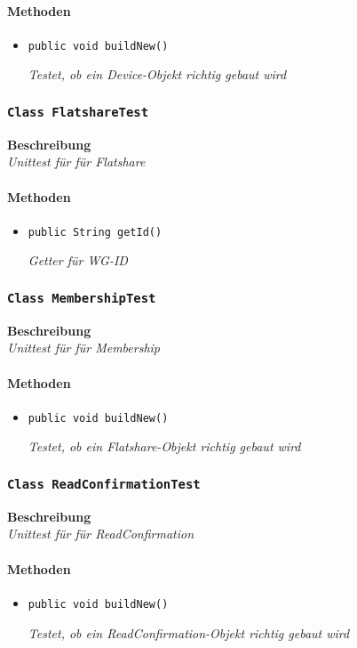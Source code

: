  \paragraph*{Methoden}
 \begin{itemize}
    	\item{\texttt{public void buildNew()}}
    	
    	\textit{Testet, ob ein Device-Objekt richtig gebaut wird}
 \end{itemize}

 \subsubsection{\texttt{Class FlatshareTest}}
 \textbf{Beschreibung} \\
 \textit{Unittest für für Flatshare}
 \paragraph*{Methoden}
 \begin{itemize}
    	\item{\texttt{public String getId()}}
    	
    	\textit{Getter für WG-ID}
 \end{itemize}

 \subsubsection{\texttt{Class MembershipTest}}
 \textbf{Beschreibung} \\
 \textit{Unittest für für Membership}
 \paragraph*{Methoden}
 \begin{itemize}
    	\item{\texttt{public void buildNew()}}
    	
    	\textit{Testet, ob ein Flatshare-Objekt richtig gebaut wird}
 \end{itemize}
 
 \subsubsection{\texttt{Class ReadConfirmationTest}}
 \textbf{Beschreibung} \\
 \textit{Unittest für für ReadConfirmation}
 \paragraph*{Methoden}
 \begin{itemize}
    	\item{\texttt{public void buildNew()}}
    	
    	\textit{Testet, ob ein ReadConfirmation-Objekt richtig gebaut wird}
 \end{itemize}
 
